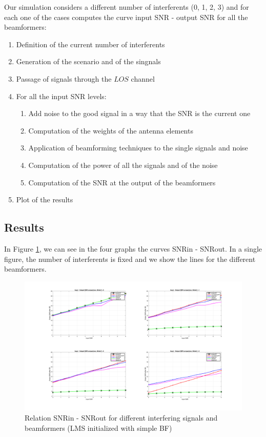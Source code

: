 Our simulation considers a different number of interferents (0, 1, 2, 3) and for each one of the cases computes the 
curve input SNR - output SNR for all the beamformers:

\begin{enumerate}
    \item Definition of the current number of interferents
    \item Generation of the scenario and of the singnals
    \item Passage of signals through the $LOS$ channel
    \item For all the input SNR levels:
    \begin{enumerate}
        \item Add noise to the good signal in a way that the SNR is the current one
        \item Computation of the weights of the antenna elements 
        \item Application of beamforming techniques to the single signals and noise
        \item Computation of the power of all the signals and of the noise
        \item Computation of the SNR at the output of the beamformers
    \end{enumerate}
    \item Plot of the results
\end{enumerate}

\subsection{Results}

In Figure \ref{fig:SNR_comparison}, we can see in the four graphs the curves SNRin - SNRout. In a single figure, the 
number of interferents is fixed and we show the lines for the different beamformers.

\begin{figure}[ht]
    \includegraphics[width=\linewidth]{SNR_comparison.png}  
    \caption{Relation SNRin - SNRout for different interfering signals and beamformers (LMS initialized with simple BF)}  
    \label{fig:SNR_comparison}
\end{figure}

